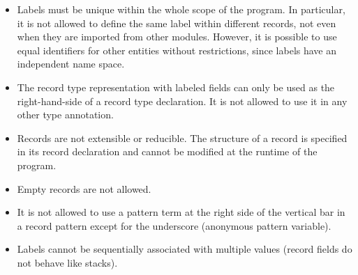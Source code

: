 \begin{itemize}
\item Labels must be unique within the whole scope of the program.
  In particular, it is not allowed to define the same label within
  different records, not even when they are imported from other
  modules. However, it is possible to use equal identifiers for other
  entities without restrictions, since labels have an independent
  name space.
\item The record type representation with labeled fields can only be
  used as the right-hand-side of a record type declaration. It is
  not allowed to use it in any other type annotation.
\item Records are not extensible or reducible. The structure of a
  record is specified in its record declaration and cannot be
  modified at the runtime of the program.
\item Empty records are not allowed.
\item It is not allowed  to use a pattern term
  at the right side of the vertical bar in a record pattern
  except for the underscore (anonymous pattern variable).
\item Labels cannot be sequentially associated with multiple values
  (record fields do not behave like stacks).
\end{itemize}
